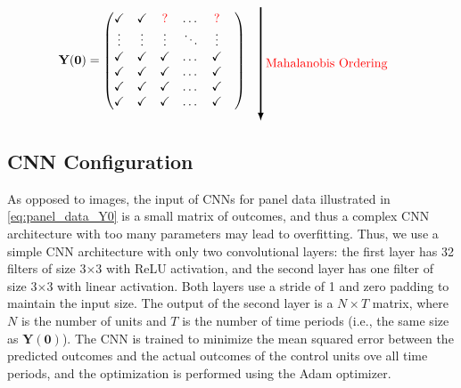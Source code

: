 \begin{align}
        \mathbf{Y(0)}&=\begin{pmatrix}
        \tick  & \tick & {\color{red} ?}   & \dots & {\color{red} ?}  &\\
        \vdots   &  \vdots & \vdots &\ddots &\vdots& \\
        \tick & \tick & \tick  & \dots & \tick& \\
        \tick  & \tick & \tick   & \dots & \tick & \\
        \tick & \tick & \tick   & \dots & \tick & \\
        \tick & \tick & \tick   & \dots & \tick & 
        \end{pmatrix} 
        \quad
        \begin{tikzpicture}[baseline={(current bounding box.center)}]
            \draw[very thick,->,>=latex] (0,1.6) -- (0,-1.6) node[midway,right] {\textcolor{red}{Mahalanobis Ordering}};
        \end{tikzpicture}
\end{align}


\subsection{CNN Configuration}
As opposed to images, the input of CNNs for panel data illustrated in \eqref{eq:panel_data_Y0} is a small matrix of outcomes, 
and thus a complex CNN architecture with too many parameters may lead to overfitting.
Thus, we use a simple CNN architecture with only two convolutional layers: the first layer has 32 filters of size 3$\times$3 with ReLU activation,
and the second layer has one filter of size 3$\times$3 with linear activation.
Both layers use a stride of 1 and zero padding to maintain the input size.
The output of the second layer is a $N \times T$ matrix, where $N$ is the number of units and $T$ is the number of time periods (i.e., the same size as $\mathbf{Y(0)}$).
The CNN is trained to minimize the mean squared error between the predicted outcomes and the actual outcomes of the control units ove all time periods,
and the optimization is performed using the Adam optimizer.